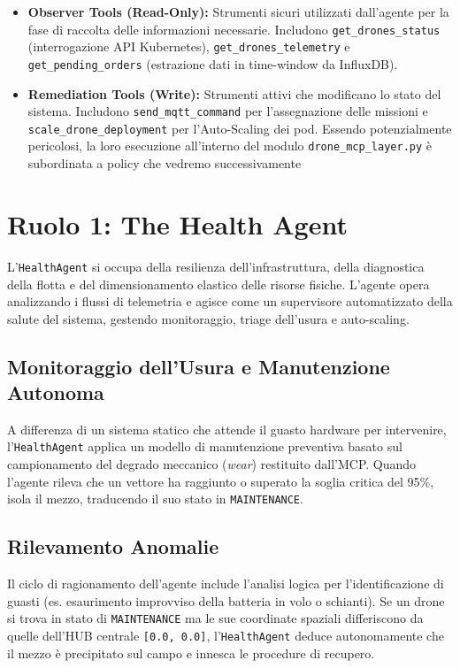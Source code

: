 \begin{itemize}
    \item \textbf{Observer Tools (Read-Only):} Strumenti sicuri utilizzati dall'agente per la fase di raccolta delle informazioni necessarie. Includono \texttt{get\_drones\_status} (interrogazione API Kubernetes), \texttt{get\_drones\_telemetry} e \texttt{get\_pending\_orders} (estrazione dati in time-window da InfluxDB).
    \item \textbf{Remediation Tools (Write):} Strumenti attivi che modificano lo stato del sistema. Includono \texttt{send\_mqtt\_command} per l'assegnazione delle missioni e \texttt{scale\_drone\_deployment} per l'Auto-Scaling dei pod. Essendo potenzialmente pericolosi, la loro esecuzione all'interno del modulo \texttt{drone\_mcp\_layer.py} è subordinata a policy che vedremo successivamente
\end{itemize}

\section{Ruolo 1: The Health Agent}
\label{sec:health_agent}
L'\texttt{HealthAgent} si occupa della resilienza dell'infrastruttura, della diagnostica della flotta e del dimensionamento elastico delle risorse fisiche. L'agente opera analizzando i flussi di telemetria e agisce come un supervisore automatizzato della salute del sistema, gestendo monitoraggio, triage dell'usura e auto-scaling.

\subsection*{Monitoraggio dell'Usura e Manutenzione Autonoma}
A differenza di un sistema statico che attende il guasto hardware per intervenire, l'\texttt{HealthAgent} applica un modello di manutenzione preventiva basato sul campionamento del degrado meccanico (\textit{wear}) restituito dall'MCP. 
Quando l'agente rileva che un vettore ha raggiunto o superato la soglia critica del 95\%, isola il mezzo, traducendo il suo stato in \texttt{MAINTENANCE}.

\subsection*{Rilevamento Anomalie}
Il ciclo di ragionamento dell'agente include l'analisi logica per l'identificazione di guasti (es. esaurimento improvviso della batteria in volo o schianti). Se un drone si trova in stato di \texttt{MAINTENANCE} ma le sue coordinate spaziali differiscono da quelle dell'HUB centrale \texttt{[0.0, 0.0]}, l'\texttt{HealthAgent} deduce autonomamente che il mezzo è precipitato sul campo e innesca le procedure di recupero. 

